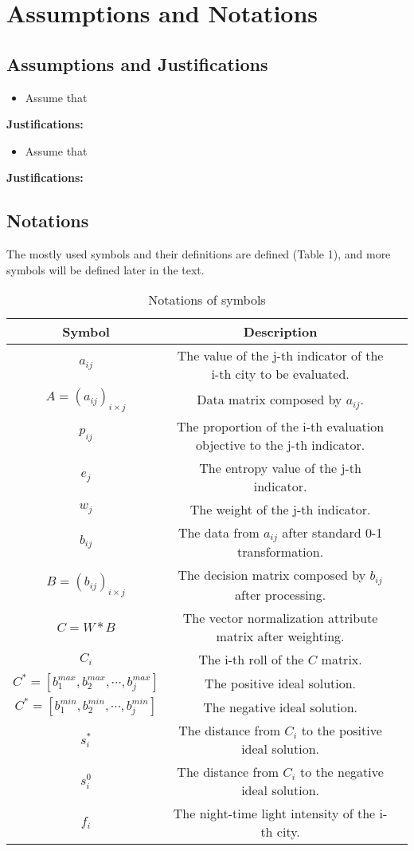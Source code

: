 \MinParskip{}
\section{Assumptions and Notations}
\subsection{Assumptions and Justifications} 

\begin{itemize}
    \item Assume that 
\end{itemize}

\textbf{Justifications: }

\begin{itemize}
    \item Assume that 
\end{itemize}

\textbf{Justifications: }


\subsection{Notations}
The mostly used symbols and their definitions are defined (Table 1), and more symbols will be defined later in the text. 
\begin{table}[h] \centering
    \caption{Notations of symbols}
    \begin{tabular}{ccl}
        \toprule
        Symbol & Description\\ \hline
        $a_{ij}$ & The value of the j-th indicator of the i-th city to be evaluated. \\
        $A=(a_{ij})_{i×j}$ & Data matrix composed by $a_{ij}$. \\
        $p_{ij}$ & The proportion of the i-th evaluation objective to the j-th indicator. \\
        $e_j$ & The entropy value of the j-th indicator. \\
        $w_j$ & The weight of the j-th indicator. \\
        $b_{ij}$ & The data from $a_{ij}$ after standard 0-1 transformation.\\
        $B=(b_{ij})_{i×j}$ & The decision matrix composed by $b_{ij}$ after processing.\\
        $C=W*B$ & The vector normalization attribute matrix after weighting. \\
        $C_i$ & The i-th roll of the $C$ matrix. \\
        $C^*=[b_1^{max},b_2^{max},\cdots,b_j^{max}]$ & The positive ideal solution. \\
        $C^*=[b_1^{min},b_2^{min},\cdots,b_j^{min}]$ & The negative ideal solution. \\
        $s_i^*$ & The distance from $C_i$ to the positive ideal solution. \\
        $s_i^0$ & The distance from $C_i$ to the negative ideal solution. \\
        $f_i$ & The night-time light intensity of the i-th city. \\
        \bottomrule
    \end{tabular}
\end{table}